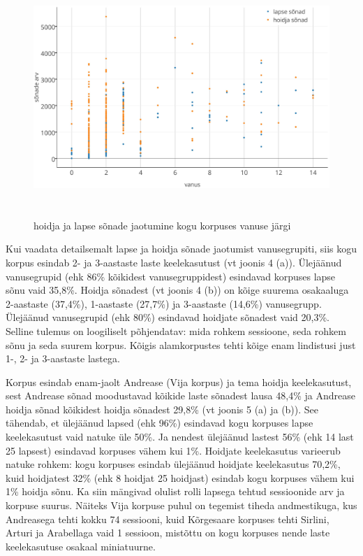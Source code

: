 \documentclass[12pt]{article}
\begin{document}
\begin{figure}[H]
    \centering
    \includegraphics[width=\textwidth, height=9cm]{lindistused_vanus_sonad_crop}
    \caption{hoidja ja lapse sõnade jaotumine kogu korpuses vanuse järgi}
\end{figure}

Kui vaadata detailsemalt lapse ja hoidja sõnade jaotumist vanusegrupiti, siis kogu korpus esindab 2- ja 3-aastaste laste keelekasutust (vt joonis 4 (a)). Ülejäänud vanusegrupid (ehk 86\% kõikidest vanusegruppidest) esindavad korpuses lapse sõnu vaid 35,8\%. Hoidja sõnadest (vt joonis 4 (b)) on kõige suurema osakaaluga 2-aastaste (37,4\%), 1-aastaste (27,7\%) ja 3-aastaste (14,6\%) vanusegrupp. Ülejäänud vanusegrupid (ehk 80\%) esindavad hoidjate sõnadest vaid 20,3\%. Selline tulemus on loogiliselt põhjendatav: mida rohkem sessioone, seda rohkem sõnu ja seda suurem korpus. Kõigis alamkorpustes tehti kõige enam lindistusi just 1-, 2- ja 3-aastaste lastega.

Korpus esindab enam-jaolt Andrease (Vija korpus) ja tema hoidja keelekasutust, sest Andrease sõnad moodustavad kõikide laste sõnadest lausa 48,4\% ja Andrease hoidja sõnad kõikidest hoidja sõnadest 29,8\% (vt joonis 5 (a) ja (b)). See tähendab, et ülejäänud lapsed (ehk 96\%) esindavad kogu korpuses lapse keelekasutust vaid natuke üle 50\%. Ja nendest ülejäänud lastest 56\% (ehk 14 last 25 lapsest) esindavad korpuses vähem kui 1\%. Hoidjate keelekasutus varieerub natuke rohkem: kogu korpuses esindab ülejäänud hoidjate keelekasutus 70,2\%, kuid hoidjatest 32\% (ehk 8 hoidjat 25 hoidjast) esindab kogu korpuses vähem kui 1\% hoidja sõnu. Ka siin mängivad olulist rolli lapsega tehtud sessioonide arv ja korpuse suurus. Näiteks Vija korpuse puhul on tegemist tiheda andmestikuga, kus Andreasega tehti kokku 74 sessiooni, kuid Kõrgesaare korpuses tehti Sirlini, Arturi ja Arabellaga vaid 1 sessioon, mistõttu on kogu korpuses nende laste keelekasutuse osakaal miniatuurne.
\end{document}
